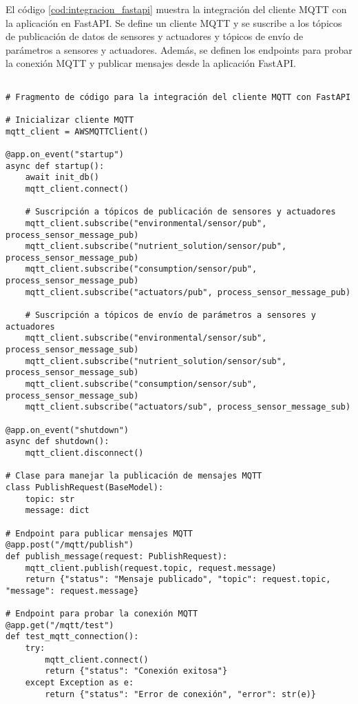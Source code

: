 El código \ref{cod:integracion_fastapi} muestra la integración del cliente MQTT
con la aplicación en FastAPI. Se define un cliente MQTT y se suscribe a los
tópicos de publicación de datos de sensores y actuadores y tópicos de envío de
parámetros a sensores y actuadores. Además, se definen los endpoints para
probar la conexión MQTT y publicar mensajes desde la aplicación FastAPI.

\begin{lstlisting}[label=cod:integracion_fastapi,caption=Cliente MQTT en FastAPI, language=PythonUTF8]

# Fragmento de código para la integración del cliente MQTT con FastAPI

# Inicializar cliente MQTT
mqtt_client = AWSMQTTClient()

@app.on_event("startup")
async def startup():
    await init_db()
    mqtt_client.connect()
         
    # Suscripción a tópicos de publicación de sensores y actuadores
    mqtt_client.subscribe("environmental/sensor/pub", process_sensor_message_pub)
    mqtt_client.subscribe("nutrient_solution/sensor/pub", process_sensor_message_pub)
    mqtt_client.subscribe("consumption/sensor/pub", process_sensor_message_pub)
    mqtt_client.subscribe("actuators/pub", process_sensor_message_pub)

    # Suscripción a tópicos de envío de parámetros a sensores y actuadores
    mqtt_client.subscribe("environmental/sensor/sub", process_sensor_message_sub)
    mqtt_client.subscribe("nutrient_solution/sensor/sub", process_sensor_message_sub)
    mqtt_client.subscribe("consumption/sensor/sub", process_sensor_message_sub)
    mqtt_client.subscribe("actuators/sub", process_sensor_message_sub)

@app.on_event("shutdown")
async def shutdown():
    mqtt_client.disconnect()

# Clase para manejar la publicación de mensajes MQTT
class PublishRequest(BaseModel):
    topic: str
    message: dict
    
# Endpoint para publicar mensajes MQTT
@app.post("/mqtt/publish")
def publish_message(request: PublishRequest):
    mqtt_client.publish(request.topic, request.message)
    return {"status": "Mensaje publicado", "topic": request.topic, "message": request.message}
    
# Endpoint para probar la conexión MQTT
@app.get("/mqtt/test")
def test_mqtt_connection():
    try:
        mqtt_client.connect()
        return {"status": "Conexión exitosa"}
    except Exception as e:
        return {"status": "Error de conexión", "error": str(e)}
\end{lstlisting}

